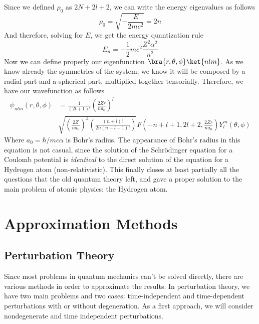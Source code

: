 \documentclass[a4paper, 11pt]{book}
\newcommand{\1}{\opr{\mathds{1}}}
\theoremstyle{plain}
\begin{document}
	Since we defined $\rho_0$ as $2N+2l+2$, we can write the energy eigenvalues as follows
	\begin{equation*}
		\rho_0=\sqrt{-\frac{E}{2mc^2}}=2n
	\end{equation*}
	And therefore, solving for $E$, we get the energy quantization rule
	\begin{equation}
		E_n=-\frac{1}{2}mc^2\frac{Z^2\alpha^2}{n^2}
		\label{eq:energyquant1}
	\end{equation}
	Now we can define properly our eigenfunction $\bra{r,\theta,\phi}\ket{nlm}$. As we know already the symmetries of the system, we know it will be composed by a radial part and a spherical part, multiplied together tensorially. Therefore, we have our wavefunction as follows
	\begin{equation}
		\begin{aligned}
		\psi_{nlm}(r,\theta,\phi)&=\frac{1}{(2l+1)!}\left( \frac{2Zr}{na_0} \right)^l\\
		&\sqrt{\left( \frac{2Z}{na_0}\right)^3\left(\frac{(n+l)!}{2n(n-l-1)!} \right)}F\left( -n+l+1,2l+2,\frac{2Zr}{na_0} \right)Y^m_l(\theta,\phi)
		\end{aligned}
		\label{eq:wavefunc}
	\end{equation}
	Where $a_0=\hbar/mc\alpha$ is Bohr's radius. The appearance of Bohr's radius in this equation is not casual, since the solution of the Schrödinger equation for a Coulomb potential is \emph{identical} to the direct solution of the equation for a Hydrogen atom (non-relativistic). This finally closes at least partially all the questions that the old quantum theory left, and gave a proper solution to the main problem of atomic physics: the Hydrogen atom.
	\chapter{Approximation Methods}
	\section{Perturbation Theory}
	Since most problems in quantum mechanics can't be solved directly, there are various methods in order to approximate the results. In perturbation theory, we have two main problems and two cases: time-independent and time-dependent perturbations with or without degeneration. As a first approach, we will consider nondegenerate and time independent perturbations.
\end{document}
